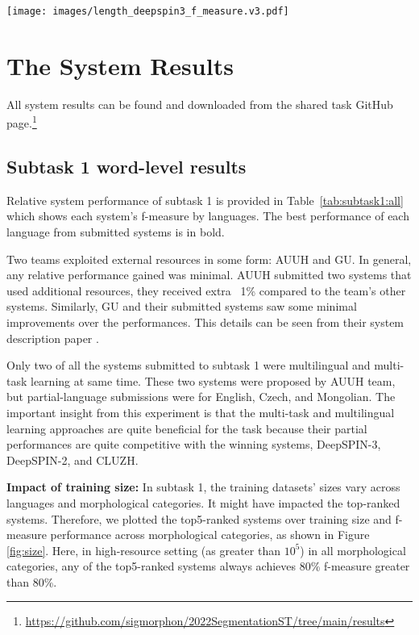 \documentclass[11pt]{article}
\begin{document}
\begin{figure*}[!h]
\begin{center}
\texttt{[image: images/length\_deepspin3\_f\_measure.v3.pdf]}
\caption{Impact of word length over languages and morphological categories: Results from DeepSPIN-3, the winning system of subtask 1, word-level morpheme segmentation}
\label{fig:word_len}
\end{center}
\end{figure*}

\section{The System Results}
All system results can be found and downloaded from the shared task GitHub page.\footnote{\url{https://github.com/sigmorphon/2022SegmentationST/tree/main/results}}

\subsection{Subtask 1 word-level results}
Relative system performance of subtask 1 is provided in Table~\ref{tab:subtask1:all} which shows each system's f-measure by languages. The best performance of each language from submitted systems is in bold. 

Two teams exploited external resources in some form: AUUH and GU. In general, any relative performance gained was minimal. AUUH submitted two systems that used additional resources, they received extra ~1\% compared to the team's other systems. Similarly, GU and their submitted systems saw some minimal improvements over the performances. This details can be seen from their system description paper \cite{GU2022}. 

Only two of all the systems submitted to subtask 1 were multilingual and multi-task learning at same time. These two systems were proposed by AUUH team, but partial-language submissions were for English, Czech, and Mongolian. The important insight from this experiment is that the multi-task and multilingual learning approaches are quite beneficial for the task because their partial performances are quite competitive with the winning systems, DeepSPIN-3, DeepSPIN-2, and CLUZH. 




\vspace{1em} \noindent \textbf{Impact of training size:} In subtask 1, the training datasets' sizes vary across languages and morphological categories. It might have impacted the top-ranked systems. Therefore, we plotted the top5-ranked systems over training size and f-measure performance across morphological categories, as shown in Figure \ref{fig:size}. Here, in high-resource setting (as greater than $10^5$) in all morphological categories, any of the top5-ranked systems always achieves 80\% f-measure greater than 80\%. 
\end{document}
